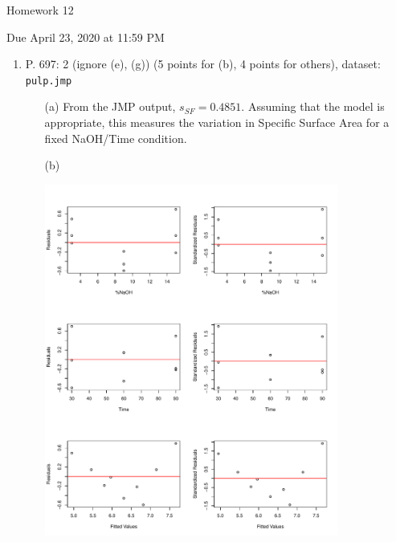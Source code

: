 \documentclass{article}\usepackage[]{graphicx}\usepackage[]{color}
\newenvironment{knitrout}{}{} %
\begin{document}
\begin{center} \LARGE
Homework 12
\end{center}
\begin{center} \Large
Due April 23, 2020 at 11:59 PM 
\end{center}



\begin{enumerate}
	\item P. 697: 2 (ignore (e), (g)) (5 points for (b), 4 points for others), dataset: {\tt pulp.jmp} 

	\begin{itemize}
	\item[(a)]
	From the JMP output, $s_{SF} = 0.4851$. Assuming that the model is appropriate, this measures the variation in Specific Surface Area for a fixed NaOH/Time condition.
	\item[(b)] \ 
	
\begin{knitrout}
\color{fgcolor}

{\centering \includegraphics[width=0.8\textwidth]{figure/unnamed-chunk-3-1} 

}



\end{knitrout}
  

\end{itemize}
\end{enumerate}
\end{document}

